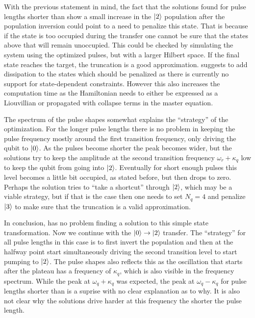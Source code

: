 \documentclass[main.tex]{subfiles}
\begin{document}
With the previous statement in mind, the fact that the solutions found for pulse lengths shorter than  show a small increase in the \(\ket{2}\) population after the population inversion could point to a need to penalize this state.
That is because if the state is too occupied during the transfer one cannot be sure that the states above that will remain unoccupied.
This could be checked by simulating the system using the optimized pulses, but with a larger Hilbert space.
If the final state reaches the target, the truncation is a good approximation.
\krotov{} suggests to add dissipation to the states which should be penalized as there is currently no support for state-dependent constraints.
However this also increases the computation time as the Hamiltonian needs to either be expressed as a Liouvillian or propagated with collapse terms in the master equation.

The spectrum of the pulse shapes somewhat explains the ``strategy'' of the optimization.
For the longer pulse lengths there is no problem in keeping the pulse frequency mostly around the first transition frequency, only driving the qubit to \(\ket{0}\).
As the pulses become shorter the peak becomes wider, but the solutions try to keep the amplitude at the second transition frequency \(\omega_r+\kappa_q\) low to keep the qubit from going into \(\ket{2}\).
Eventually for short enough pulses this level becomes a little bit occupied, as stated before, but then drops to zero.
Perhaps the solution tries to ``take a shortcut'' through \(\ket{2}\), which may be a viable strategy, but if that is the case then one needs to set \(N_q = 4\) and penalize \(\ket{3}\) to make sure that the truncation is a valid approximation.

In conclusion, \krotov{} has no problem finding a solution to this simple state transformation.
Now we continue with the \(\ket{0}\rightarrow\ket{2}\) transfer.
The ``strategy'' for all pulse lengths in this case is to first invert the population and then at the halfway point start simultaneously driving the second transition level to start pumping to \(\ket{2}\).
The pulse shapes also reflects this as the oscillation that starts after the plateau has a frequency of \(\kappa_q\), which is also visible in the frequency spectrum.
While the peak at \(\omega_q+\kappa_q\) was expected, the peak at \(\omega_q-\kappa_q\) for pulse lengths shorter than  is a suprise with no clear explanation as to why.
It is also not clear why the solutions drive harder at this frequency the shorter the pulse length.
\end{document}
